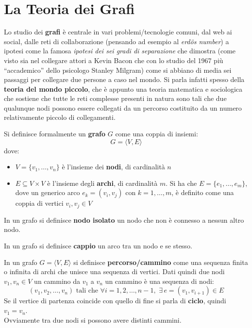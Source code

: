 \documentclass[a4paper,12pt, oneside]{book}
\begin{document}
\section{La Teoria dei Grafi}
Lo studio dei \textbf{grafi} è centrale in vari problemi/tecnologie comuni,
dal web ai social, dalle reti di collaborazione (pensando ad esempio al
\textit{erd\"{o}s number}) a ipotesi come la famosa
\textit{ipotesi dei sei gradi di separazione} che dimostra (come visto sia nel
collegare attori a Kevin Bacon che con lo studio del 1967 più ``accademico''
dello psicologo Stanley Milgram)
come si abbiano di media sei passaggi per collegare due persone a caso nel
mondo. Si parla infatti spesso della \textbf{teoria del mondo piccolo}, che è
appunto una teoria matematica e sociologica che sostiene che tutte le reti
complesse presenti in natura sono tali che due qualunque nodi possono essere
collegati da un percorso costituito da un numero relativamente piccolo di
collegamenti.
\begin{definizione}
  Si definisce formalmente un \textbf{grafo} $G$ come una coppia di insiemi:
  \[G=\langle V, E\rangle\]
  dove:
  \begin{itemize}
    \item $V=\{v_1,\ldots,v_n\}$ è l'insieme dei \textbf{nodi}, di cardinalità
    $n$ 
    \item $E\subseteq V\times V$ è l'insieme degli \textbf{archi}, di
    cardinalità $m$. Si ha che $E=\{e_1,\ldots,e_m\}$, dove un generico arco
    $e_k=(v_i,v_j)$ con $k=1,\ldots,m$, è definito come una coppia di vertici
    $v_i,v_j\in V$ 
  \end{itemize}
\end{definizione}
\begin{definizione}
  In un grafo si definisce \textbf{nodo isolato} un nodo che non è connesso a
  nessun altro nodo. 
\end{definizione}
\begin{definizione}
  In un grafo si definisce \textbf{cappio} un arco tra un nodo e se stesso.
\end{definizione}
\begin{definizione}
  In un grafo $G=\langle V,E\rangle$ si definisce \textbf{percorso/cammino} come
  una sequenza finita o infinita 
  di archi che unisce una sequenza di vertici. Dati quindi due nodi $v_1,v_n\in
  V$ un cammino da $v_1$ a $v_n$ un cammino è una sequenza di nodi: 
  \[(v_1,v_2, \ldots, v_n) \mbox{ tali che }\forall i =1,2,\ldots,
    n-1,\,\,\exists \,e=(v_1, v_{i+1})\in E\]
  Se il vertice di partenza coincide con quello di fine si parla di
  \textbf{ciclo}, quindi $v_1=v_n$. \\
  Ovviamente tra due nodi si possono avere distinti cammini.
\end{definizione}
\end{document}
